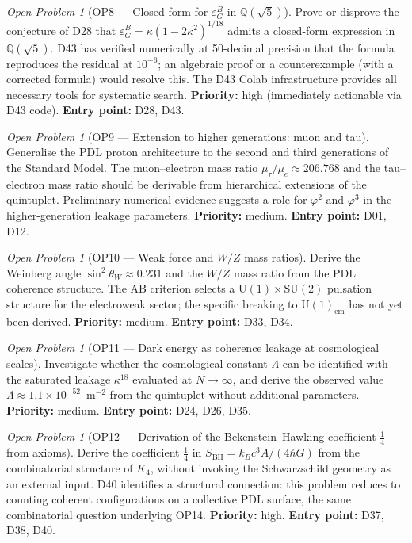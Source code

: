\documentclass[11pt,a4paper]{article}
\theoremstyle{plain}
\theoremstyle{definition}
\theoremstyle{remark}
\newtheorem{openproblem}[theorem]{Open Problem}
\newcommand{\SBH}{S_{\mathrm{BH}}}
\newcommand{\epsGeomB}{\varepsilon_G^B}
\begin{document}
\begin{openproblem}[OP8 --- Closed-form for $\epsGeomB$ in $\mathbb{Q}(\sqrt{5})$]
\label{op:epsGeomB}
Prove or disprove the conjecture of D28 that $\epsGeomB=\kappa(1-2\kappa^2)^{1/18}$ admits a closed-form expression in $\mathbb{Q}(\sqrt{5})$. D43 has verified numerically at 50-decimal precision that the formula reproduces the residual at $10^{-6}$; an algebraic proof or a counterexample (with a corrected formula) would resolve this. The D43 Colab infrastructure provides all necessary tools for systematic search. \textbf{Priority:} high (immediately actionable via D43 code). \textbf{Entry point:} D28, D43.
\end{openproblem}

\begin{openproblem}[OP9 --- Extension to higher generations: muon and tau]
\label{op:generations}
Generalise the PDL proton architecture to the second and third generations of the Standard Model. The muon--electron mass ratio $\mu_\tau/\mu_e\approx 206.768$ and the tau--electron mass ratio should be derivable from hierarchical extensions of the quintuplet. Preliminary numerical evidence suggests a role for $\varphi^2$ and $\varphi^3$ in the higher-generation leakage parameters. \textbf{Priority:} medium. \textbf{Entry point:} D01, D12.
\end{openproblem}

\begin{openproblem}[OP10 --- Weak force and $W/Z$ mass ratios]
\label{op:weak}
Derive the Weinberg angle $\sin^2\theta_W\approx 0.231$ and the $W/Z$ mass ratio from the PDL coherence structure. The AB criterion selects a $\mathrm{U}(1)\times\mathrm{SU}(2)$ pulsation structure for the electroweak sector; the specific breaking to $\mathrm{U}(1)_{\mathrm{em}}$ has not yet been derived. \textbf{Priority:} medium. \textbf{Entry point:} D33, D34.
\end{openproblem}

\begin{openproblem}[OP11 --- Dark energy as coherence leakage at cosmological scales]
\label{op:darkenergy}
Investigate whether the cosmological constant $\Lambda$ can be identified with the saturated leakage $\kappa^{18}$ evaluated at $N\to\infty$, and derive the observed value $\Lambda\approx 1.1\times10^{-52}$~m$^{-2}$ from the quintuplet without additional parameters. \textbf{Priority:} medium. \textbf{Entry point:} D24, D26, D35.
\end{openproblem}

\begin{openproblem}[OP12 --- Derivation of the Bekenstein--Hawking coefficient $\tfrac{1}{4}$ from axioms]
\label{op:BHcoeff}
Derive the coefficient $\tfrac{1}{4}$ in $\SBH=k_Bc^3A/(4\hbar G)$ from the combinatorial structure of $K_4$, without invoking the Schwarzschild geometry as an external input. D40 identifies a structural connection: this problem reduces to counting coherent configurations on a collective PDL surface, the same combinatorial question underlying OP14. \textbf{Priority:} high. \textbf{Entry point:} D37, D38, D40.
\end{openproblem}
\end{document}
